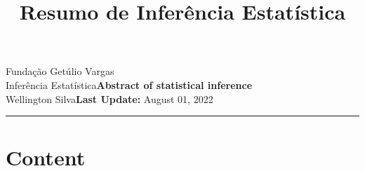 \documentclass{article}
\title{Resumo de Inferência Estatística}
\author{}
\date{}
\newcommand{\assignment}{Abstract of statistical inference}
\newcommand{\duedate}{August 01, 2022}
\begin{document}
	
	Fundação Getúlio Vargas\hfill\\
	Inferência Estatística\hfill\textbf{\assignment}\\
	Wellington Silva\hfill\textbf{Last Update:} \duedate\\
	\smallskip\hrule\bigskip
	
	{\let\newpage\relax\maketitle}
	\maketitle
	
	\section*{Content}
	
	\textbf{}
	\vspace{2.6mm}
	
	\textbf{}
	\vspace{2.6mm}
	
	\textbf{}
	\vspace{2.6mm}
	
	\textbf{}
	\vspace{2.6mm}
	
	\textbf{}
	\vspace{2.6mm}
	
	\textbf{}
	\vspace{2.6mm}
	
	\textbf{}
	\vspace{2.6mm}
	
	\textbf{}
	\vspace{2.6mm}
	
	\textbf{}
	\vspace{2.6mm}
	
	\textbf{}
	\vspace{2.6mm}
	
	\textbf{}
	\vspace{2.6mm}
	
	\textbf{}
	\vspace{2.6mm}
	
	\textbf{}
	\vspace{2.6mm}
	
	\textbf{}
	\vspace{2.6mm}
	
\end{document}
